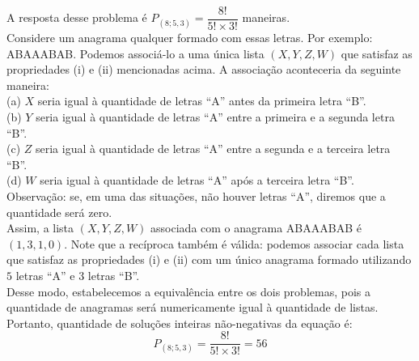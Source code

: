 \documentclass[12pt, a4paper]{article}
\begin{document}
A resposta desse problema é \(P_{(8; 5,3)} = \dfrac{8!}{5!\times 3!}\) maneiras. \\

Considere um anagrama qualquer formado com essas letras. Por exemplo: ABAAABAB. Podemos associá-lo a uma única lista \((X,Y,Z,W)\) que satisfaz as propriedades (i) e (ii) mencionadas acima. A associação aconteceria da seguinte maneira: \\

(a) \(X\) seria igual à quantidade de letras ``A'' antes da primeira letra ``B''. \\
(b) \(Y\) seria igual à quantidade de letras ``A'' entre a primeira e a segunda letra ``B''. \\
(c) \(Z\) seria igual à quantidade de letras ``A'' entre a segunda e a terceira letra ``B''. \\
(d) \(W\) seria igual à quantidade de letras ``A'' após a terceira letra ``B''. \\

Observação: se, em uma das situações, não houver letras ``A'', diremos que a quantidade será zero.\\

Assim, a lista \((X,Y,Z,W)\) associada com o anagrama ABAAABAB é \((1,3,1,0)\). Note que a recíproca também é válida: podemos associar cada lista que satisfaz as propriedades (i) e (ii) com um único anagrama formado utilizando \(5\) letras ``A'' e \(3\) letras ``B''. \\

Desse modo, estabelecemos a equivalência entre os dois problemas, pois a quantidade de anagramas será numericamente igual à quantidade de listas. Portanto, quantidade de soluções inteiras não-negativas da equação é: \[P_{(8; 5,3)} = \dfrac{8!}{5!\times 3!} = 56\] 
\end{document}

